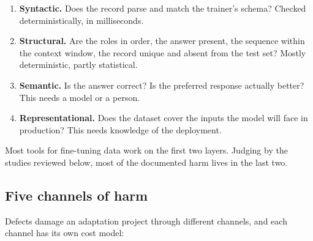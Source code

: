 \begin{enumerate}
\def\labelenumi{\arabic{enumi}.}
\tightlist
\item
  \textbf{Syntactic.} Does the record parse and match the trainer's schema? Checked deterministically, in milliseconds.
\item
  \textbf{Structural.} Are the roles in order, the answer present, the sequence within the context window, the record unique and absent from the test set? Mostly deterministic, partly statistical.
\item
  \textbf{Semantic.} Is the answer correct? Is the preferred response actually better? This needs a model or a person.
\item
  \textbf{Representational.} Does the dataset cover the inputs the model will face in production? This needs knowledge of the deployment.
\end{enumerate}

Most tools for fine-tuning data work on the first two layers.  Judging by the studies reviewed below, most of the documented harm lives in the last two.

\subsection{Five channels of harm}

Defects damage an adaptation project through different channels, and each channel has its own cost model:

